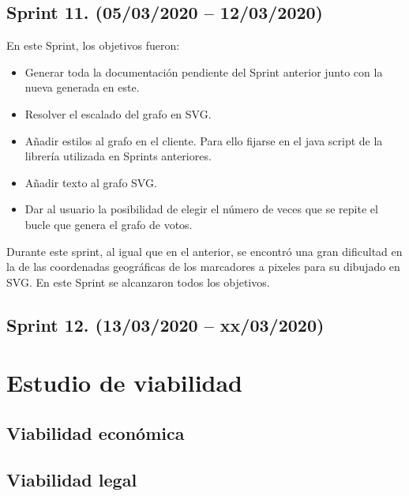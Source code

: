 \subsection{Sprint 11. (05/03/2020 -- 12/03/2020)}
En este Sprint, los objetivos fueron:
\begin{itemize}
	\item Generar toda la documentación pendiente del Sprint anterior junto con la nueva generada en este.
	\item Resolver el escalado del grafo en SVG.
	\item Añadir estilos al grafo en el cliente. Para ello fijarse en el java script de la librería utilizada en Sprints anteriores.
	\item Añadir texto al grafo SVG.
	\item Dar al usuario la posibilidad de elegir el número de veces que se repite el bucle que genera el grafo de votos.
\end{itemize}
Durante este sprint, al igual que en el anterior, se encontró una gran dificultad en la de las coordenadas geográficas de los marcadores a pixeles para su dibujado en SVG.
En este Sprint se alcanzaron todos los objetivos.

\subsection{Sprint 12. (13/03/2020 -- xx/03/2020)}


\section{Estudio de viabilidad}

\subsection{Viabilidad económica}

\subsection{Viabilidad legal}


